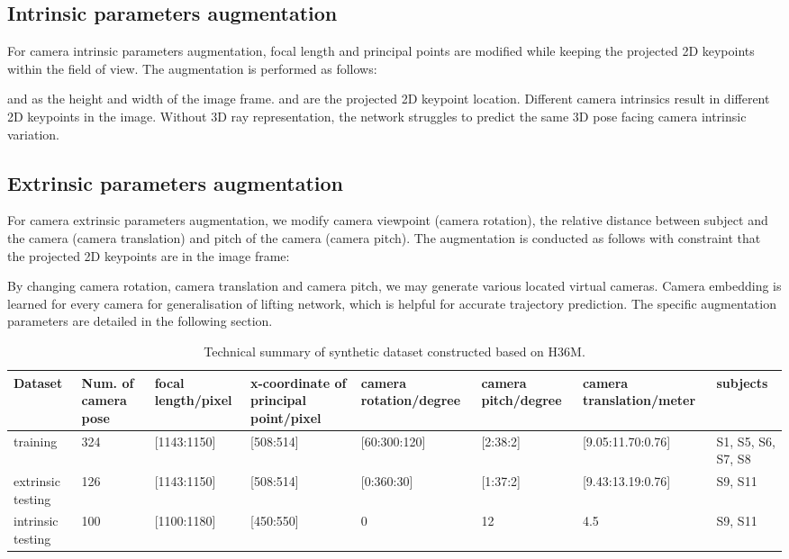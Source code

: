 \documentclass[10pt,twocolumn,letterpaper]{article}
\begin{document}
\subsection*{Intrinsic parameters augmentation} 
\label{subsec: intrinsci_aug}
For camera intrinsic parameters augmentation, focal length  and principal points  are modified while keeping the projected 2D keypoints within the field of view. The augmentation is performed as follows:


 and  as the height and width of the image frame.  and  are the projected 2D keypoint location. Different camera intrinsics result in different 2D keypoints in the image. Without 3D ray representation, the network struggles to predict the same 3D pose facing camera intrinsic variation.

\subsection*{Extrinsic parameters augmentation} 
\label{subsec: extrinsci_aug}
For camera extrinsic parameters augmentation, we modify camera viewpoint  (camera rotation), the relative distance between subject and the camera  (camera translation) and pitch of the camera  (camera pitch). The augmentation is conducted as follows with constraint that the projected 2D keypoints are in the image frame:  


By changing camera rotation, camera translation and camera pitch, we may generate various located virtual cameras. Camera embedding is learned for every camera for generalisation of lifting network, which is helpful for accurate trajectory prediction. The specific augmentation parameters are detailed in the following section.

\begin{table*}[ht]
\centering
\tiny
\caption{Technical summary of synthetic dataset constructed based on H36M.}
\begin{tabular}{l|llllll|l}
\toprule
                  Dataset & Num. of camera pose  & focal length/pixel  & x-coordinate of principal point/pixel &camera rotation/degree  &camera pitch/degree &camera translation/meter & subjects           \\ \midrule
training          & 324                  & [1143:1150]         &[508:514]                            &[60:300:120]            &[2:38:2]            & [9.05:11.70:0.76]       & S1, S5, S6, S7, S8 \\
extrinsic testing & 126                  & [1143:1150]         &[508:514]                            &[0:360:30]              &[1:37:2]            & [9.43:13.19:0.76]       & S9, S11            \\
intrinsic testing & 100                  & [1100:1180]         &[450:550]                            &0                       &12                  & 4.5                     & S9, S11            \\ \bottomrule
\end{tabular}
\label{table:dataset}
\\
\end{table*}
\end{document}
